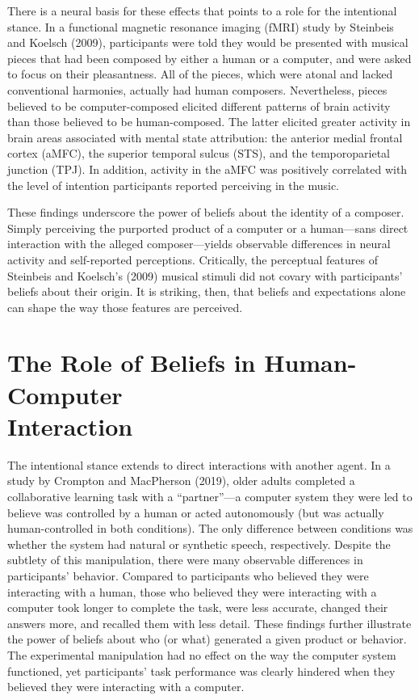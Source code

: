 \documentclass[12pt,twoside]{reedthesis}
\begin{document}
There is a neural basis for these effects that points to a role for the intentional stance. In a functional magnetic resonance imaging (fMRI) study by Steinbeis and Koelsch (2009), participants were told they would be presented with musical pieces that had been composed by either a human or a computer, and were asked to focus on their pleasantness. All of the pieces, which were atonal and lacked conventional harmonies, actually had human composers. Nevertheless, pieces believed to be computer-composed elicited different patterns of brain activity than those believed to be human-composed. The latter elicited greater activity in brain areas associated with mental state attribution: the anterior medial frontal cortex (aMFC), the superior temporal sulcus (STS), and the temporoparietal junction (TPJ). In addition, activity in the aMFC was positively correlated with the level of intention participants reported perceiving in the music. 

These findings underscore the power of beliefs about the identity of a composer. Simply perceiving the purported product of a computer or a human—sans direct interaction with the alleged composer—yields observable differences in neural activity and self-reported perceptions. Critically, the perceptual features of Steinbeis and Koelsch’s (2009) musical stimuli did not covary with participants’ beliefs about their origin. It is striking, then, that beliefs and expectations alone can shape the way those features are perceived. 

\section*{The Role of Beliefs in Human-Computer \\Interaction
}

The intentional stance extends to direct interactions with another agent. In a study by Crompton and MacPherson (2019), older adults completed a collaborative learning task with a “partner”—a computer system they were led to believe was controlled by a human or acted autonomously (but was actually human-controlled in both conditions). The only difference between conditions was whether the system had natural or synthetic speech, respectively. Despite the subtlety of this manipulation, there were many observable differences in participants’ behavior. Compared to participants who believed they were interacting with a human, those who believed they were interacting with a computer took longer to complete the task, were less accurate, changed their answers more, and recalled them with less detail. These findings further illustrate the power of beliefs about who (or what) generated a given product or behavior. The experimental manipulation had no effect on the way the computer system functioned, yet participants’ task performance was clearly hindered when they believed they were interacting with a computer. 
\end{document}
